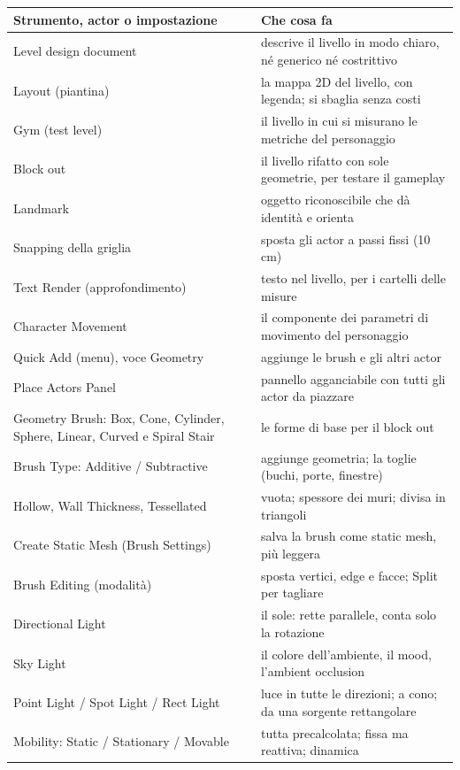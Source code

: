 \begin{table}[htbp]
\centering
\footnotesize
\begin{tabular}{@{}p{5.8cm}p{8.2cm}@{}}
\toprule
\textbf{Strumento, actor o impostazione} & \textbf{Che cosa fa} \\
\midrule
Level design document & descrive il livello in modo chiaro, né generico né costrittivo \\
Layout (piantina) & la mappa 2D del livello, con legenda; si sbaglia senza costi \\
Gym (test level) & il livello in cui si misurano le metriche del personaggio \\
Block out & il livello rifatto con sole geometrie, per testare il gameplay \\
Landmark & oggetto riconoscibile che dà identità e orienta \\
Snapping della griglia & sposta gli actor a passi fissi (10 cm) \\
Text Render (approfondimento) & testo nel livello, per i cartelli delle misure \\
Character Movement & il componente dei parametri di movimento del personaggio \\
Quick Add (menu), voce Geometry & aggiunge le brush e gli altri actor \\
Place Actors Panel & pannello agganciabile con tutti gli actor da piazzare \\
Geometry Brush: Box, Cone, Cylinder, Sphere, Linear, Curved e Spiral Stair & le forme di
base per il block out \\
Brush Type: Additive / Subtractive & aggiunge geometria; la toglie (buchi, porte, finestre) \\
Hollow, Wall Thickness, Tessellated & vuota; spessore dei muri; divisa in triangoli \\
Create Static Mesh (Brush Settings) & salva la brush come static mesh, più leggera \\
Brush Editing (modalità) & sposta vertici, edge e facce; Split per tagliare \\
Directional Light & il sole: rette parallele, conta solo la rotazione \\
Sky Light & il colore dell'ambiente, il mood, l'ambient occlusion \\
Point Light / Spot Light / Rect Light & luce in tutte le direzioni; a cono; da una sorgente
rettangolare \\
Mobility: Static / Stationary / Movable & tutta precalcolata; fissa ma reattiva; dinamica \\

\end{tabular}
\end{table}
